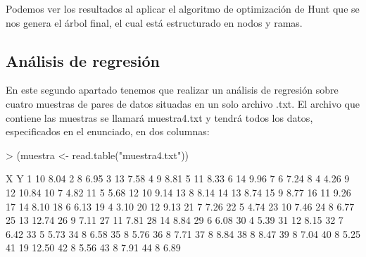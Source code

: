 \documentclass[a4paper]{article}
\begin{document}
Podemos ver los resultados al aplicar el algoritmo de optimización de Hunt que se nos genera el árbol final, el cual está estructurado en nodos y ramas.

\subsection{Análisis de regresión}En este segundo apartado tenemos que realizar un análisis de regresión sobre cuatro muestras de pares de datos situadas en un solo archivo .txt. El archivo que contiene las muestras se llamará muestra4.txt y tendrá todos los datos, especificados en el enunciado, en dos columnas:
\begin{Schunk}
\begin{Sinput}
> (muestra <- read.table("muestra4.txt"))
\end{Sinput}
\begin{Soutput}
    X     Y
1  10  8.04
2   8  6.95
3  13  7.58
4   9  8.81
5  11  8.33
6  14  9.96
7   6  7.24
8   4  4.26
9  12 10.84
10  7  4.82
11  5  5.68
12 10  9.14
13  8  8.14
14 13  8.74
15  9  8.77
16 11  9.26
17 14  8.10
18  6  6.13
19  4  3.10
20 12  9.13
21  7  7.26
22  5  4.74
23 10  7.46
24  8  6.77
25 13 12.74
26  9  7.11
27 11  7.81
28 14  8.84
29  6  6.08
30  4  5.39
31 12  8.15
32  7  6.42
33  5  5.73
34  8  6.58
35  8  5.76
36  8  7.71
37  8  8.84
38  8  8.47
39  8  7.04
40  8  5.25
41 19 12.50
42  8  5.56
43  8  7.91
44  8  6.89
\end{Soutput}
\end{Schunk}
\end{document}
